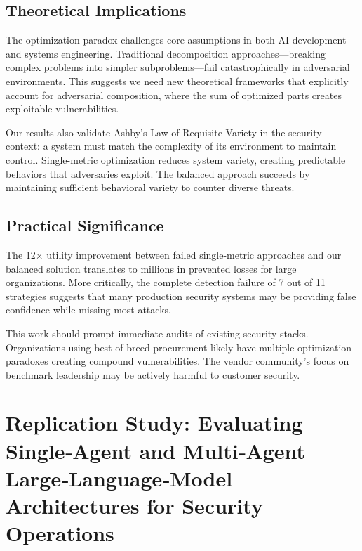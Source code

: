 \documentclass[10pt,conference]{IEEEtran}
\begin{document}
\subsection{Theoretical Implications}

The optimization paradox challenges core assumptions in both AI development and systems engineering. Traditional decomposition approaches---breaking complex problems into simpler subproblems---fail catastrophically in adversarial environments. This suggests we need new theoretical frameworks that explicitly account for adversarial composition, where the sum of optimized parts creates exploitable vulnerabilities.

Our results also validate Ashby's Law of Requisite Variety in the security context: a system must match the complexity of its environment to maintain control. Single-metric optimization reduces system variety, creating predictable behaviors that adversaries exploit. The balanced approach succeeds by maintaining sufficient behavioral variety to counter diverse threats.

\subsection{Practical Significance}

The 12$\times$ utility improvement between failed single-metric approaches and our balanced solution translates to millions in prevented losses for large organizations. More critically, the complete detection failure of 7 out of 11 strategies suggests that many production security systems may be providing false confidence while missing most attacks.

This work should prompt immediate audits of existing security stacks. Organizations using best-of-breed procurement likely have multiple optimization paradoxes creating compound vulnerabilities. The vendor community's focus on benchmark leadership may be actively harmful to customer security.

\section{Replication Study: Evaluating Single‑Agent and Multi‑Agent
Large‑Language‑Model Architectures for Security Operations}
\end{document}
